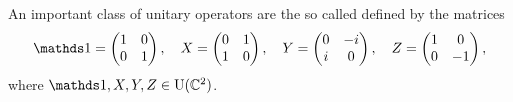 An important class of unitary operators are the so called  defined by the matrices
\begin{align} \label{eq:pauli-ops}
	\I = \begin{pmatrix} 1 & 0 \\ 0 & 1 \end{pmatrix}, \quad X = \begin{pmatrix} 0 & 1 \\ 1 & 0 \end{pmatrix}, \quad Y = \begin{pmatrix} 0 & -i \\ i & 0 \end{pmatrix}, \quad Z = \begin{pmatrix} 1 & 0 \\ 0 & -1 \end{pmatrix}, 
\end{align} 
where $\I, X, Y, Z \in \Unitary(\complex^2)$.
